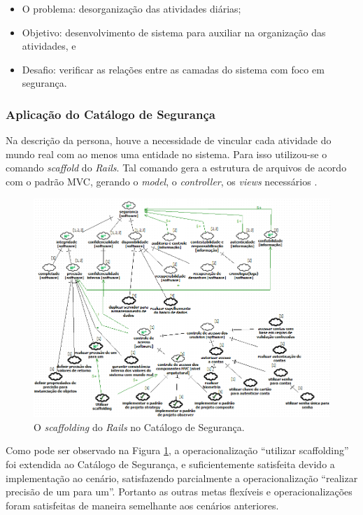 \begin{itemize}
	\item O problema: desorganização das atividades diárias;
	\item Objetivo: desenvolvimento de sistema para auxiliar na organização das atividades, e
	\item Desafio: verificar as relações entre as camadas do sistema com foco em segurança.
\end{itemize}


\subsubsection{Aplicação do Catálogo de Segurança}

Na descrição da persona, houve a necessidade de vincular cada atividade do mundo real com ao menos uma entidade no sistema. Para isso utilizou-se o comando \textit{scaffold} do \textit{Rails}. Tal comando gera a estrutura de arquivos de acordo com o padrão MVC, gerando o \textit{model}, o \textit{controller}, os \textit{views} necessários \cite{railscommunity}. 

\begin{figure}[h!]
	\centering
	\includegraphics[keepaspectratio=true,scale=0.7]{figuras/catalogoPersona3.PNG}
	\caption{O \textit{scaffolding} do \textit{Rails} no Catálogo de Segurança.}
	\label{catalogoPersona3}
\end{figure}

Como pode ser observado na Figura \ref{catalogoPersona3}, a operacionalização “utilizar scaffolding” foi extendida ao Catálogo de Segurança, e suficientemente satisfeita devido a implementação ao cenário, satisfazendo parcialmente a operacionalização  “realizar precisão de um para um”. Portanto as outras metas flexíveis e operacionalizações foram satisfeitas de maneira semelhante aos cenários anteriores. 

